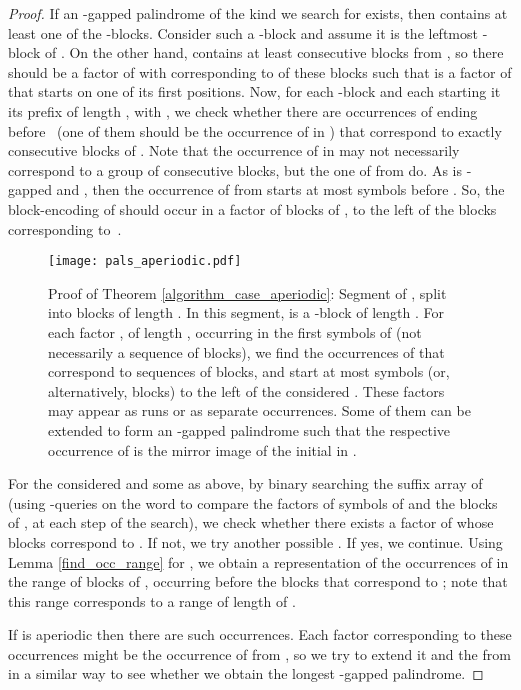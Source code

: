 \documentclass[final]{dmtcs-episciences}
\begin{document}
\begin{proof}
If an -gapped palindrome  of the kind we search for exists, then  contains at least one of the -blocks. Consider such a -block  and assume it is the leftmost -block of . On the other hand,  contains at least  consecutive blocks from , so there should be a factor  of  with  corresponding to  of these  blocks such that  is a factor of  that starts on one of its first  positions. Now, for each -block  and each  starting it its prefix of length , with , we check whether there are occurrences of  ending before~ (one of them should be the occurrence of  in ) that correspond to exactly  consecutive blocks of . Note that the occurrence of  in  may not necessarily correspond to a group of  consecutive blocks, but the one of  from  do. As  is -gapped and , then the occurrence of  from  starts at most  symbols before . So, the block-encoding of  should occur in a factor of   blocks of , to the left of the blocks corresponding to~.


\begin{figure}\begin{center}
\texttt{[image: pals\_aperiodic.pdf]}
\end{center}
\caption{
Proof of Theorem \ref{algorithm_case_aperiodic}: Segment of , split into blocks of length . In this segment,  is a -block of length . For each factor , of length , occurring in the first  symbols of  (not necessarily a sequence of blocks), we find the occurrences of  that correspond to sequences of  blocks, and start at most  symbols (or, alternatively,  blocks) to the left of the considered . These  factors may appear as runs or as separate occurrences. Some of them can be extended to form an -gapped palindrome  such that the respective occurrence of  is the mirror image of the initial  in .}
\end{figure}

For the considered  and some  as above, by binary searching the suffix array of  (using -queries on the word  to compare the factors of  symbols of  and the blocks of , at each step of the search), we check whether there exists a factor  of  whose blocks correspond to . If not, we try another possible . If yes, we continue. Using Lemma \ref{find_occ_range} for , we obtain a representation of the occurrences of  in the range of  blocks of , occurring before the blocks that correspond to ; note that this range corresponds to a range of length  of . 

If  is aperiodic then there are  such occurrences. Each factor corresponding to these occurrences might be the occurrence of  from , so we try to extend it and the  from  in a similar way to see whether we obtain the longest -gapped palindrome. 


\end{proof}
\end{document}
